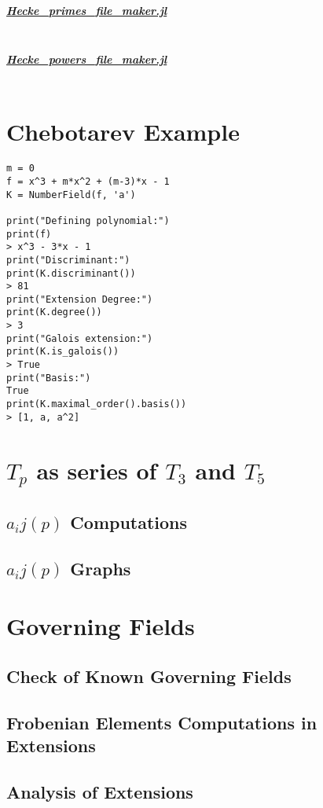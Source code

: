\subparagraph{\href{https://github.com/pauldubois98/ModularFormsModuloTwo.jl/blob/master/src/data/Hecke_primes_file_maker.jl}{Hecke\_primes\_file\_maker.jl}}
\label{code:HeckePrimesFileMaker}
\inputminted[breaklines]{julia}{Module/HeckePrimesFileMaker.jl}

\subparagraph{\href{https://github.com/pauldubois98/ModularFormsModuloTwo.jl/blob/master/src/data/Hecke_powers_file_maker.jl}{Hecke\_powers\_file\_maker.jl}}
\label{code:HeckePowersFileMaker}
\inputminted[breaklines]{julia}{Module/HeckePowersFileMaker.jl}

\section{Chebotarev Example}
\label{code:ChebotarevExample}
\begin{verbatim}
m = 0
f = x^3 + m*x^2 + (m-3)*x - 1
K = NumberField(f, 'a')

print("Defining polynomial:")
print(f)
> x^3 - 3*x - 1
print("Discriminant:")
print(K.discriminant())
> 81
print("Extension Degree:")
print(K.degree())
> 3
print("Galois extension:")
print(K.is_galois())
> True
print("Basis:")
True
print(K.maximal_order().basis())
> [1, a, a^2]
\end{verbatim}

\section{$T_p$ as series of $T_3$ and $T_5$}
\subsection{$a_ij(p)$ Computations}
\subsection{$a_ij(p)$ Graphs}

\section{Governing Fields}
\subsection{Check of Known Governing Fields}
\subsection{Frobenian Elements Computations in Extensions}
\subsection{Analysis of Extensions}

